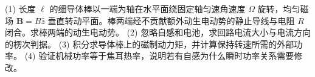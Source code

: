 (1) 长度 \(\ell\) 的细导体棒以一端为轴在水平面绕固定轴匀速角速度 \(\Omega\) 旋转，均匀磁场 \(\boldsymbol B=B\hat z\) 垂直转动平面。棒两端经不贡献额外动生电动势的静止导线与电阻 \(R\) 闭合。求棒两端的动生电动势。
(2) 忽略自感和电池，求回路电流大小与电流方向的楞次判据。
(3) 积分求导体棒上的磁制动力矩，并计算保持转速所需的外部功率。
(4) 验证机械功率等于焦耳热率，说明若有自感为什么瞬时功率关系需要修改。
